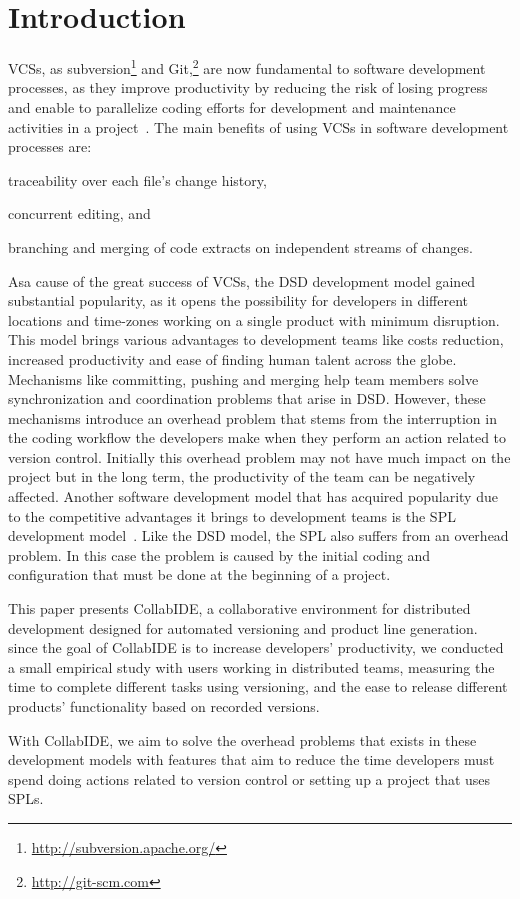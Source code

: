 
\section{Introduction}
\label{sec:introduction}

\acp{VCS}, as subversion\footnote{\url{http://subversion.apache.org/}} and 
Git,\footnote{\url{http://git-scm.com}} are now fundamental to software development processes, as they 
improve productivity by reducing the risk of losing progress and enable to parallelize coding efforts for 
development and maintenance activities in a project~\cite{spinellis05}.
The main benefits of using \acp{VCS} in software development processes are:
\begin{enumerate*}[label=(\arabic*)]
\item traceability over each file's change history, 
\item concurrent editing, and 
\item branching and merging of code extracts on independent streams of changes. 
\end{enumerate*}
Asa cause of the great success of \acp{VCS}, the \ac{DSD} development model gained substantial popularity, as it opens the possibility for developers in different locations and time-zones working on a single product with minimum disruption. This model brings various advantages to 
development teams like costs reduction, increased productivity and ease of finding human talent 
across the globe. Mechanisms like committing, pushing and merging help team members solve synchronization 
and coordination problems that arise in \ac{DSD}. However, these mechanisms introduce an overhead 
problem that stems from the interruption in the coding workflow the developers make when they 
perform an action related to version control. Initially this overhead problem may not have much impact 
on the project but in the long term, the productivity of the team can be negatively affected.
Another software development model that has acquired popularity due to the competitive advantages 
it brings to development teams is the \ac{SPL} development model~\cite{pohl+05sple}. Like the \ac{DSD} 
model, the SPL also suffers from an overhead problem. In this case the problem is caused by the initial 
coding and configuration that must be done at the beginning of a project.

This paper presents CollabIDE, a collaborative environment for 
distributed development designed for automated versioning and product line generation. since the goal 
of CollabIDE is to increase developers' productivity, we conducted a small empirical study with users 
working in distributed teams, measuring the time to complete different tasks using versioning, and the 
ease to release different products' functionality based on recorded versions. 

With CollabIDE, we aim to solve the overhead problems that exists in these development models with 
features that aim to reduce the time developers must spend doing actions related to version control or 
setting up a project that uses \acp{SPL}.



\endinput